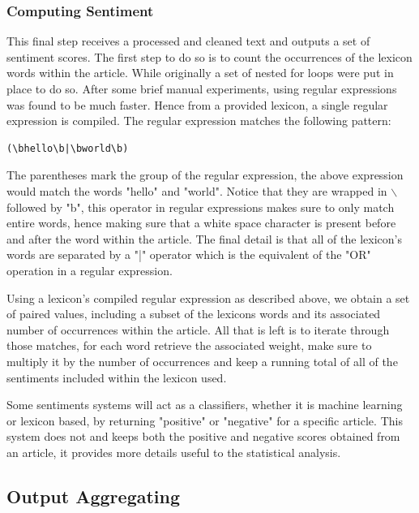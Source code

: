 \subsubsection{Computing Sentiment}

This final step receives a processed and cleaned text and outputs a set of sentiment scores. The first step to do so is to count the occurrences of the lexicon words within the article. While originally a set of nested for loops were put in place to do so. After some brief manual experiments, using regular expressions was found to be much faster. Hence from a provided lexicon, a single regular expression is compiled. The regular expression matches the following pattern:
\begin{center}
\begin{verbatim}(\bhello\b|\bworld\b)\end{verbatim}
\end{center}

The parentheses mark the group of the regular expression, the above expression would match the words "hello" and "world". Notice that they are wrapped in $\backslash$ followed by "b", this operator in regular expressions makes sure to only match entire words, hence making sure that a white space character is present before and after the word within the article. The final detail is that all of the lexicon's words are separated by a "|" operator which is the equivalent of the "OR" operation in a regular expression.

Using a lexicon's compiled regular expression as described above, we obtain a set of paired values, including a subset of the lexicons words and its associated number of occurrences within the article.
All that is left is to iterate through those matches, for each word retrieve the associated weight, make sure to multiply it by the number of occurrences and keep a running total of all of the sentiments included within the lexicon used.

Some sentiments systems will act as a classifiers, whether it is machine learning or lexicon based, by returning "positive" or "negative" for a specific article. This system does not and keeps both the positive and negative scores obtained from an article, it provides more details useful to the statistical analysis.

\subsection{Output Aggregating}

